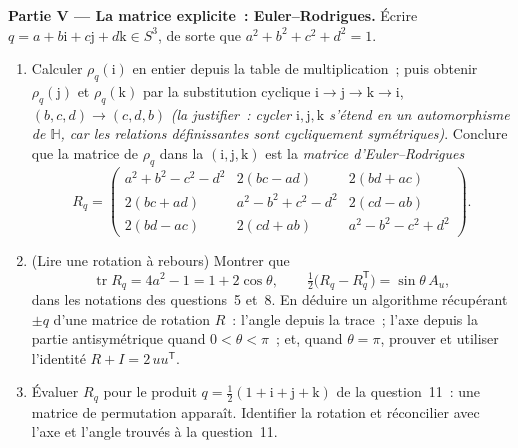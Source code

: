 \begin{problem}
\medskip
\noindent\textbf{Partie V --- La matrice explicite~:
Euler--Rodrigues.} Écrire $q = a + b\mathrm i + c\mathrm j +
d\mathrm k \in S^3$, de sorte que $a^2 + b^2 + c^2 + d^2 =
1$.
\begin{enumerate}[resume]
  \item Calculer $\rho_q(\mathrm i)$ en entier depuis la
        table de multiplication~; puis obtenir
        $\rho_q(\mathrm j)$ et $\rho_q(\mathrm k)$ par la
        substitution cyclique $\mathrm i \to \mathrm j \to
        \mathrm k \to \mathrm i$, $(b, c, d) \to (c, d, b)$
        \emph{(la justifier~: cycler $\mathrm i, \mathrm j,
        \mathrm k$ s'étend en un automorphisme de $\mathbb
        H$, car les relations définissantes sont
        cycliquement symétriques)}. Conclure que la matrice
        de $\rho_q$ dans la  $(\mathrm i, \mathrm j,
        \mathrm k)$ est la \emph{matrice d'Euler--Rodrigues}
        \[
        R_q = \begin{pmatrix}
        a^2 + b^2 - c^2 - d^2 & 2(bc - ad) & 2(bd + ac)\\
        2(bc + ad) & a^2 - b^2 + c^2 - d^2 & 2(cd - ab)\\
        2(bd - ac) & 2(cd + ab) & a^2 - b^2 - c^2 + d^2
        \end{pmatrix}.
        \]
  \item (Lire une rotation à rebours) Montrer que
        \[
        \operatorname{tr}R_q = 4a^2 - 1 = 1 + 2\cos\theta,
        \qquad
        \tfrac12\bigl(R_q - R_q^{\mathsf T}\bigr) =
        \sin\theta\,A_u,
        \]
        dans les notations des questions~5 et~8. En déduire
        un algorithme récupérant $\pm q$ d'une matrice de
        rotation $R$~: l'angle depuis la trace~; l'axe depuis
        la partie antisymétrique quand $0 < \theta < \pi$~;
        et, quand $\theta = \pi$, prouver et utiliser
        l'identité $R + I = 2\,uu^{\mathsf T}$.
  \item Évaluer $R_q$ pour le produit $q =
        \frac12(1 + \mathrm i + \mathrm j + \mathrm k)$ de
        la question~11~: une matrice de permutation
        apparaît. Identifier la rotation et réconcilier avec
        l'axe et l'angle trouvés à la question~11.
\end{enumerate}


\end{problem}
